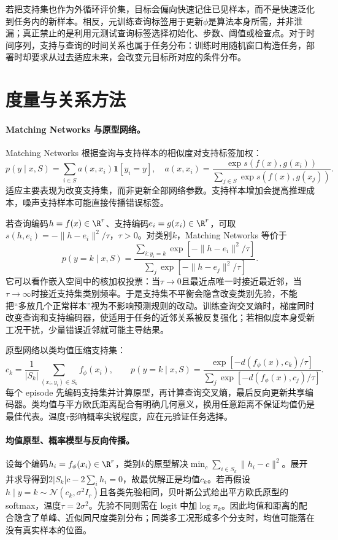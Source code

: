 若把支持集也作为外循环评价集，目标会偏向快速记住已见样本，而不是快速泛化到任务内的新样本。相反，元训练查询标签用于更新$\phi$是算法本身所需，并非泄漏；真正禁止的是利用元测试查询标签选择初始化、步数、阈值或检查点。对于时间序列，支持与查询的时间关系也属于任务分布：训练时用随机窗口构造任务，部署时却要求从过去适应未来，会改变元目标所对应的条件分布。

\section{度量与关系方法}
\paragraph{Matching Networks 与原型网络。}
Matching Networks 根据查询与支持样本的相似度对支持标签加权\cite{vinyals2016matching}：
\begin{equation}
 p(y\mid x,S)=\sum_{i\in S}a(x,x_i)\mathbf1[y_i=y],
 \quad a(x,x_i)=\frac{\exp s(f(x),g(x_i))}{\sum_{j\in S}\exp s(f(x),g(x_j))}.
\end{equation}
适应主要表现为改变支持集，而非更新全部网络参数。支持样本增加会提高推理成本，噪声支持样本可能直接传播错误标签。

若查询编码$h=f(x)\in\R^r$、支持编码$e_i=g(x_i)\in\R^r$，可取$s(h,e_i)=-\|h-e_i\|^2/\tau$，$\tau>0$。对类别$k$，Matching Networks 等价于
\begin{equation}
 p(y=k\mid x,S)=
 \frac{\sum_{i:y_i=k}\exp[-\|h-e_i\|^2/\tau]}
 {\sum_j\exp[-\|h-e_j\|^2/\tau]}.
\end{equation}
它可以看作嵌入空间中的核加权投票：当$\tau\to0$且最近点唯一时接近最近邻，当$\tau\to\infty$时接近支持集类别频率。于是支持集不平衡会隐含改变类别先验，不能把“多放几个正常样本”视为不影响预测规则的改动。训练查询交叉熵时，梯度同时改变查询和支持编码器，使适用于任务的近邻关系被反复强化；若相似度本身受新工况干扰，少量错误近邻就可能主导结果。

原型网络以类均值压缩支持集\cite{snell2017proto}：
\begin{equation}
 c_k=\frac1{|S_k|}\sum_{(x_i,y_i)\in S_k}f_\phi(x_i),\qquad
 p(y=k\mid x,S)=\frac{\exp[-d(f_\phi(x),c_k)/\tau]}
 {\sum_j\exp[-d(f_\phi(x),c_j)/\tau]}.
\end{equation}
每个 episode 先编码支持集并计算原型，再计算查询交叉熵，最后反向更新共享编码器。类均值与平方欧氏距离配合有明确几何意义，换用任意距离不保证均值仍是最佳代表。温度$\tau$影响概率尖锐程度，应在元验证任务选择。

\paragraph{均值原型、概率模型与反向传播。}
设每个编码$h_i=f_\phi(x_i)\in\R^r$，类别$k$的原型解决$\min_c\sum_{i\in S_k}\|h_i-c\|^2$。展开并求导得到$2|S_k|c-2\sum_ih_i=0$，故最优解正是均值$c_k$。若再假设$h\mid y=k\sim\mathcal N(c_k,\sigma^2I_r)$且各类先验相同，贝叶斯公式给出平方欧氏原型的 softmax，温度$\tau=2\sigma^2$。先验不同则需在 logit 中加$\log\pi_k$。因此均值和距离的配合隐含了单峰、近似同尺度类别分布；同类多工况形成多个分支时，均值可能落在没有真实样本的位置。

